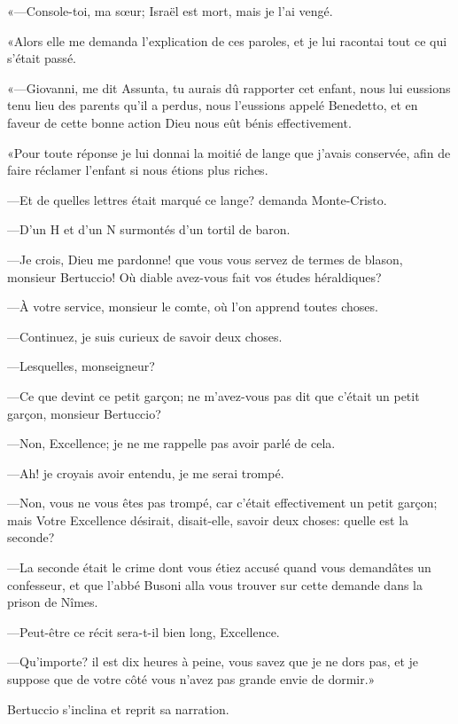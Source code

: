 «—Console-toi, ma sœur; Israël est mort, mais je l'ai vengé. 

«Alors elle me demanda l'explication de ces paroles, et je lui racontai tout ce qui s'était passé. 

«—Giovanni, me dit Assunta, tu aurais dû rapporter cet enfant, nous lui eussions tenu lieu des parents qu'il a perdus, nous l'eussions appelé Benedetto, et en faveur de cette bonne action Dieu nous eût bénis effectivement. 

«Pour toute réponse je lui donnai la moitié de lange que j'avais conservée, afin de faire réclamer l'enfant si nous étions plus riches. 

—Et de quelles lettres était marqué ce lange? demanda Monte-Cristo. 

—D'un H et d'un N surmontés d'un tortil de baron. 

—Je crois, Dieu me pardonne! que vous vous servez de termes de blason, monsieur Bertuccio! Où diable avez-vous fait vos études héraldiques? 

—À votre service, monsieur le comte, où l'on apprend toutes choses. 

—Continuez, je suis curieux de savoir deux choses. 

—Lesquelles, monseigneur? 

—Ce que devint ce petit garçon; ne m'avez-vous pas dit que c'était un petit garçon, monsieur Bertuccio? 

—Non, Excellence; je ne me rappelle pas avoir parlé de cela. 

—Ah! je croyais avoir entendu, je me serai trompé.  

—Non, vous ne vous êtes pas trompé, car c'était effectivement un petit garçon; mais Votre Excellence désirait, disait-elle, savoir deux choses: quelle est la seconde? 

—La seconde était le crime dont vous étiez accusé quand vous demandâtes un confesseur, et que l'abbé Busoni alla vous trouver sur cette demande dans la prison de Nîmes. 

—Peut-être ce récit sera-t-il bien long, Excellence. 

—Qu'importe? il est dix heures à peine, vous savez que je ne dors pas, et je suppose que de votre côté vous n'avez pas grande envie de dormir.» 

Bertuccio s'inclina et reprit sa narration. 

